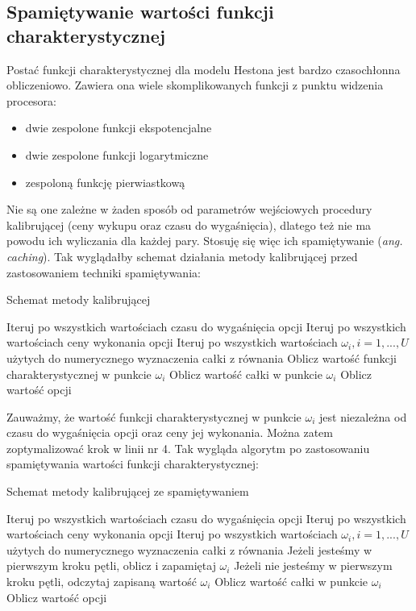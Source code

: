 \documentclass{pracamgr}
\begin{document}
\subsection{Spamiętywanie wartości funkcji charakterystycznej}
Postać funkcji charakterystycznej dla modelu Hestona jest bardzo czasochłonna obliczeniowo. 
Zawiera ona wiele skomplikowanych funkcji z punktu widzenia procesora:
\begin{itemize}
  \item dwie zespolone funkcji ekspotencjalne
  \item dwie zespolone funkcji logarytmiczne
  \item zespoloną funkcję pierwiastkową
\end{itemize}
Nie są one zależne w żaden sposób od parametrów wejściowych procedury kalibrującej (ceny wykupu oraz 
czasu do wygaśnięcia), dlatego też nie ma powodu ich wyliczania dla każdej pary. 
Stosuję się więc ich spamiętywanie (\textit{ang. caching}).
Tak wyglądałby schemat działania metody kalibrującej \cite{AcceleratingHeston} przed zastosowaniem 
techniki spamiętywania:
\begin{algorithm}[H]
\caption{Schemat metody kalibrującej}\label{euclid}
\begin{algorithmic}[1]
  \State Iteruj po wszystkich wartościach czasu do wygaśnięcia opcji
  \State Iteruj po wszystkich wartościach ceny wykonania opcji
  \State Iteruj po wszystkich wartościach $\omega_i, i = 1, ..., U $ użytych do numerycznego wyznaczenia całki z równania   
  \State Oblicz wartość funkcji charakterystycznej w punkcie $\omega_i$
  \State Oblicz wartość całki w punkcie $\omega_i$
  \State Oblicz wartość opcji
\end{algorithmic}
\label{alg:simulatedAnnealing}
\end{algorithm}
Zauważmy, że wartość funkcji charakterystycznej w punkcie $\omega_i$ jest niezależna od czasu do 
wygaśnięcia opcji oraz ceny jej wykonania. Można zatem zoptymalizować krok w linii nr 4. Tak wygląda 
algorytm po zastosowaniu spamiętywania wartości funkcji charakterystycznej:

\begin{algorithm}[H]
\caption{Schemat metody kalibrującej ze spamiętywaniem}\label{euclid}

\begin{algorithmic}[1]
  
  \State Iteruj po wszystkich wartościach czasu do wygaśnięcia opcji
  \State Iteruj po wszystkich wartościach ceny wykonania opcji
  \State Iteruj po wszystkich wartościach $\omega_i, i = 1, ..., U $ użytych do numerycznego wyznaczenia całki z równania   
  \State Jeżeli jesteśmy w pierwszym kroku pętli, oblicz i zapamiętaj $\omega_i$
  \State Jeżeli nie jesteśmy w pierwszym kroku pętli, odczytaj zapisaną wartość $\omega_i$
  \State Oblicz wartość całki w punkcie $\omega_i$
  \State Oblicz wartość opcji

\end{algorithmic}
\label{alg:simulatedAnnealing}
\end{algorithm}
\end{document}
